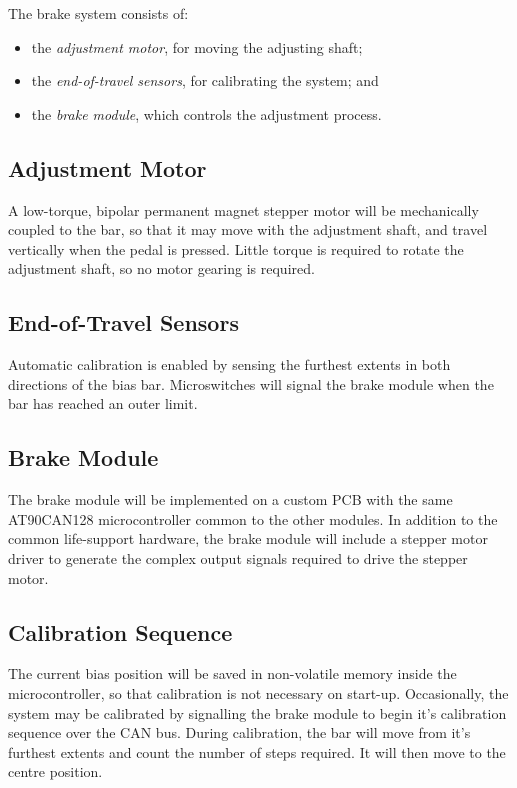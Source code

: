 The brake system consists of: 

\begin{itemize}
\item the \emph{adjustment motor}, for moving the adjusting shaft;
\item the \emph{end-of-travel sensors}, for calibrating the system; and
\item the \emph{brake module}, which controls the adjustment process.
\end{itemize}

\subsection{Adjustment Motor}

A low-torque, bipolar permanent magnet stepper motor will be mechanically coupled to the bar, so that it may move with the adjustment shaft, and travel vertically when the pedal is pressed. Little torque is required to rotate the adjustment shaft, so no motor gearing is required. 

\subsection{End-of-Travel Sensors}

Automatic calibration is enabled by sensing the furthest extents in both directions of the bias bar. Microswitches will signal the brake module when the bar has reached an outer limit. 

\subsection{Brake Module}

The brake module will be implemented on a custom PCB with the same AT90CAN128 microcontroller common to the other modules. In addition to the common life-support hardware, the brake module will include a stepper motor driver to generate the complex output signals required to drive the stepper motor.

\subsection{Calibration Sequence}

The current bias position will be saved in non-volatile memory inside the microcontroller, so that calibration is not necessary on start-up. Occasionally, the system may be calibrated by signalling the brake module to begin it's calibration sequence over the CAN bus. During calibration, the bar will move from it's furthest extents and count the number of steps required. It will then move to the centre position.

